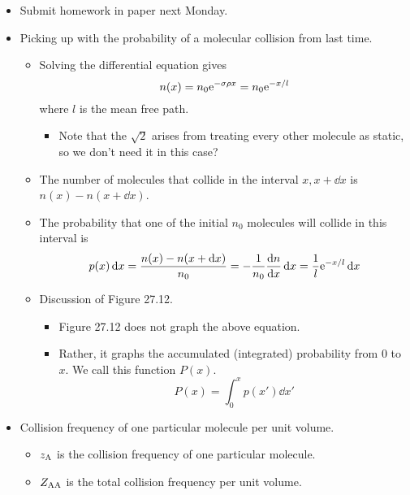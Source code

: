 \documentclass[../notes.tex]{subfiles}
\begin{document}
\begin{itemize}
    \item {}Submit homework in paper next Monday.
    \item Picking up with the probability of a molecular collision from last time.
    \begin{itemize}
        \item Solving the differential equation gives
        \begin{equation*}
            n(x) = n_0\e[-\sigma\rho x]
            = n_0\e[-x/l]
        \end{equation*}
        where $l$ is the mean free path.
        \begin{itemize}
            \item Note that the $\sqrt{2}$ arises from treating every other molecule as static, so we don't need it in this case?
        \end{itemize}
        \item The number of molecules that collide in the interval $x,x+\dd{x}$ is $n(x)-n(x+\dd{x})$.
        \item The probability that one of the initial $n_0$ molecules will collide in this interval is
        \begin{equation*}
            p(x)\dd{x} = \frac{n(x)-n(x+\dd{x})}{n_0}
            = -\frac{1}{n_0}\dv{n}{x}\dd{x}
            = \frac{1}{l}\e[-x/l]\dd{x}
        \end{equation*}
        \item Discussion of Figure 27.12.
        \begin{itemize}
            \item Figure 27.12 does not graph the above equation.
            \item Rather, it graphs the accumulated (integrated) probability from 0 to $x$. We call this function $P(x)$.
            \begin{equation*}
                P(x) = \int_0^xp(x')\dd{x'}
            \end{equation*}
        \end{itemize}
    \end{itemize}
    \item Collision frequency of one particular molecule per unit volume.
    \begin{itemize}
        \item $z_{\ce{A}}$ is the collision frequency of one particular molecule.
        \item $Z_{\ce{A}\ce{A}}$ is the total collision frequency per unit volume.

\end{itemize}
\end{itemize}
\end{document}
